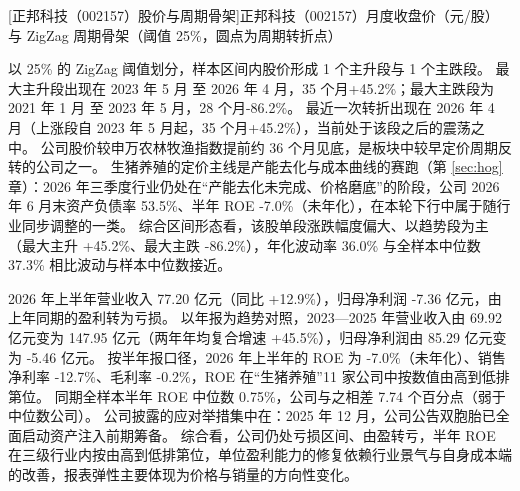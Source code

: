 \begin{center}
\begin{minipage}{\textwidth}\centering
{}

[正邦科技（002157）股价与周期骨架]{正邦科技（002157）月度收盘价（元/股）与 ZigZag 周期骨架（阈值 25\%，圆点为周期转折点）}
\end{minipage}
\end{center}

 以 25\% 的 ZigZag 阈值划分，样本区间内股价形成 1 个主升段与 1 个主跌段。 最大主升段出现在 2023 年 5 月 至 2026 年 4 月，35 个月+45.2\%；最大主跌段为 2021 年 1 月 至 2023 年 5 月，28 个月-86.2\%。 最近一次转折出现在 2026 年 4 月（上涨段自 2023 年 5 月起，35 个月+45.2\%），当前处于该段之后的震荡之中。 公司股价较申万农林牧渔指数提前约 36 个月见底，是板块中较早定价周期反转的公司之一。 生猪养殖的定价主线是产能去化与成本曲线的赛跑（第 \ref{sec:hog} 章）：2026 年三季度行业仍处在“产能去化未完成、价格磨底”的阶段，公司 2026 年 6 月末资产负债率 53.5\%、半年 ROE -7.0\%（未年化），在本轮下行中属于随行业同步调整的一类。 综合区间形态看，该股单段涨跌幅度偏大、以趋势段为主（最大主升 +45.2\%、最大主跌 -86.2\%），年化波动率 36.0\% 与全样本中位数 37.3\% 相比波动与样本中位数接近。

 2026 年上半年营业收入 77.20 亿元（同比 +12.9\%），归母净利润 -7.36 亿元，由上年同期的盈利转为亏损。 以年报为趋势对照，2023---2025 年营业收入由 69.92 亿元变为 147.95 亿元（两年年均复合增速 +45.5\%），归母净利润由 85.29 亿元变为 -5.46 亿元。 按半年报口径，2026 年上半年的 ROE 为 -7.0\%（未年化）、销售净利率 -12.7\%、毛利率 -0.2\%，ROE 在“生猪养殖”11 家公司中按数值由高到低排第位。 同期全样本半年 ROE 中位数 0.75\%，公司与之相差 7.74 个百分点（弱于中位数公司）。 公司披露的应对举措集中在：2025 年 12 月，公司公告双胞胎已全面启动资产注入前期筹备。 综合看，公司仍处亏损区间、由盈转亏，半年 ROE 在三级行业内按由高到低排第位，单位盈利能力的修复依赖行业景气与自身成本端的改善，报表弹性主要体现为价格与销量的方向性变化。

